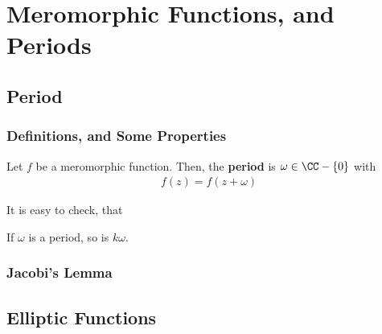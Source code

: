 \documentclass[Total.tex]{subfiles}
\begin{document}
	\chapter{Meromorphic Functions, and Periods}
		\section{Period}
			\subsection{Definitions, and Some Properties}
				\begin{Def}
					Let $f$ be a meromorphic function. Then, the \textbf{period} is $\omega\in \CC-\{0\}$ with
					\begin{gather*}
						f(z)=f(z+\omega)
					\end{gather*}
				\end{Def}
				
				It is easy to check, that 
				\begin{proposition}
					If $\omega$ is a period, so is $k\omega$. 
				\end{proposition}
			\subsection{Jacobi's Lemma}
			
		\section{Elliptic Functions}
\end{document}
